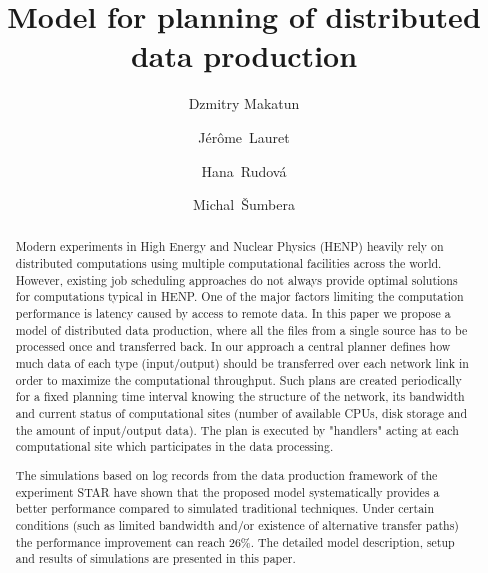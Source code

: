 \documentclass{svjour3}                     %
\begin{document}
\title{Model for planning of distributed data production}

\author{Dzmitry Makatun         \and
		J\'er\^ome~Lauret		\and
		Hana~Rudov\'a			\and
		Michal~\v{S}umbera	
}


\maketitle

\begin{abstract}
Modern experiments in High Energy and Nuclear Physics (HENP) heavily rely on distributed computations using multiple computational facilities across the world. However, existing job scheduling approaches do not always provide optimal solutions for computations typical in HENP. One of the major factors limiting the computation performance is latency caused by access to remote data. In this paper we propose a model of distributed data production, where all the files from a single source has to be processed once and transferred back. In our approach a central planner defines how much data of each type (input/output) should be transferred over each network link in order to maximize the computational throughput. Such plans are created periodically for a fixed planning time interval knowing the structure of the network, its bandwidth and current status of computational sites (number of available CPUs, disk storage and the amount of input/output data). The plan is executed by "handlers" acting at each computational site which participates in the data processing. 

The simulations based on log records from the data production framework of the experiment STAR have shown that the proposed model systematically provides a better performance compared to simulated traditional techniques. Under certain conditions (such as limited bandwidth and/or existence of alternative transfer paths) the performance improvement can reach 26\%. The detailed model description, setup and results of simulations are presented in this paper.
\end{abstract}
\end{document}
